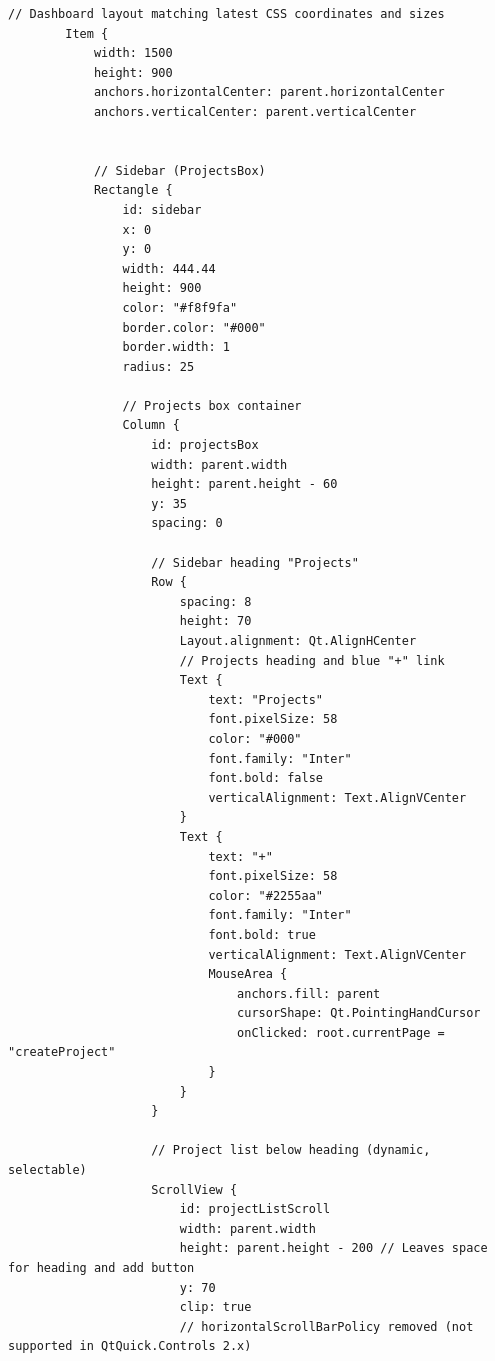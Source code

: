 \documentclass{report}
\begin{document}
\begin{lstlisting}[style=qmlstyle]
        // Dashboard layout matching latest CSS coordinates and sizes
        Item {
            width: 1500
            height: 900
            anchors.horizontalCenter: parent.horizontalCenter
            anchors.verticalCenter: parent.verticalCenter


            // Sidebar (ProjectsBox)
            Rectangle {
                id: sidebar
                x: 0
                y: 0
                width: 444.44
                height: 900
                color: "#f8f9fa"
                border.color: "#000"
                border.width: 1
                radius: 25

                // Projects box container
                Column {
                    id: projectsBox
                    width: parent.width
                    height: parent.height - 60
                    y: 35
                    spacing: 0

                    // Sidebar heading "Projects"
                    Row {
                        spacing: 8
                        height: 70
                        Layout.alignment: Qt.AlignHCenter
                        // Projects heading and blue "+" link
                        Text {
                            text: "Projects"
                            font.pixelSize: 58
                            color: "#000"
                            font.family: "Inter"
                            font.bold: false
                            verticalAlignment: Text.AlignVCenter
                        }
                        Text {
                            text: "+"
                            font.pixelSize: 58
                            color: "#2255aa"
                            font.family: "Inter"
                            font.bold: true
                            verticalAlignment: Text.AlignVCenter
                            MouseArea {
                                anchors.fill: parent
                                cursorShape: Qt.PointingHandCursor
                                onClicked: root.currentPage = "createProject"
                            }
                        }
                    }

                    // Project list below heading (dynamic, selectable)
                    ScrollView {
                        id: projectListScroll
                        width: parent.width
                        height: parent.height - 200 // Leaves space for heading and add button
                        y: 70
                        clip: true
                        // horizontalScrollBarPolicy removed (not supported in QtQuick.Controls 2.x)


\end{lstlisting}
\end{document}
